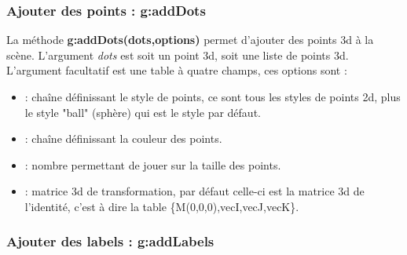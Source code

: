 \documentclass[%
10pt,%
a4paper,%
french,%
]%
{article}%
\begin{document}
\subsubsection{Ajouter des points : g:addDots}

La méthode \textbf{g:addDots(dots,options)} permet d'ajouter des points 3d à la scène. L'argument \emph{dots} est soit un point 3d, soit une liste de points 3d. L'argument facultatif  est une table à quatre champs, ces options sont :
\begin{itemize}
        \item {} : chaîne définissant le style de points, ce sont tous les styles de points 2d, plus le style "ball" (sphère) qui est le style par défaut. 
    \item {} : chaîne définissant la couleur des points.
    \item {} : nombre permettant de jouer sur la taille des points.
    \item {} : matrice 3d de transformation, par défaut celle-ci est la matrice 3d de l'identité, c'est à dire la table \{M(0,0,0),vecI,vecJ,vecK\}.
\end{itemize}

\subsubsection{Ajouter des labels : g:addLabels}
\end{document}
